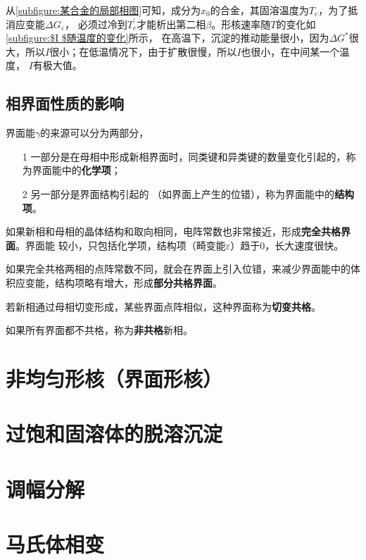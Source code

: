             从\autoref{subfigure:某合金的局部相图}可知，成分为$x_0$的合金，其固溶温度为$T_e$，为了抵消应变能$\Delta G_\varepsilon$，
            必须过冷到$T_e^{\prime}$才能析出第二相$\beta$。形核速率随$T$的变化如\autoref{subfigure:$I $随温度的变化}所示，
            在高温下，沉淀的推动能量很小，因为$\Delta G^*$很大，所以$I$很小；在低温情况下，由于扩散很慢，所以$I$也很小，在中间某一个温度，
            $I$有极大值。

        \subsection{相界面性质的影响}

            界面能$\gamma$的来源可以分为两部分，
            \begin{itemize}
                \item[1] 一部分是在母相中形成新相界面时，同类键和异类键的数量变化引起的，称为界面能中的\textbf{化学项}；
                \item[2] 另一部分是界面结构引起的 （如界面上产生的位错），称为界面能中的\textbf{结构项}。
            \end{itemize}
            
            如果新相和母相的晶体结构和取向相同，电阵常数也非常接近，形成\textbf{完全共格界面}。界面能
            较小，只包括化学项，结构项（畸变能$\varepsilon$）趋于0，长大速度很快。

            如果完全共格两相的点阵常数不同，就会在界面上引入位错，来减少界面能中的体积应变能，结构项略有增大，形成\textbf{部分共格界面}。

            若新相通过母相切变形成，某些界面点阵相似，这种界面称为\textbf{切变共格}。

            如果所有界面都不共格，称为\textbf{非共格}新相。

            
    \section{非均匀形核（界面形核）}
        
    \section{过饱和固溶体的脱溶沉淀}
    \section{调幅分解}
    \section{马氏体相变}